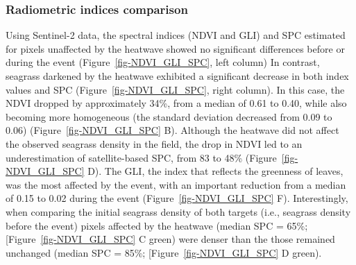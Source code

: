 \documentclass[
  number]{elsarticle}
\begin{document}
\subsubsection{Radiometric indices
comparison}\label{radiometric-indices-comparison}

Using Sentinel-2 data, the spectral indices (NDVI and GLI) and SPC
estimated for pixels unaffected by the heatwave showed no significant
differences before or during the event (Figure~\ref{fig-NDVI_GLI_SPC},
left column) In contrast, seagrass darkened by the heatwave exhibited a
significant decrease in both index values and SPC
(Figure~\ref{fig-NDVI_GLI_SPC}, right column). In this case, the NDVI
dropped by approximately 34\%, from a median of 0.61 to 0.40, while also
becoming more homogeneous (the standard deviation decreased from 0.09 to
0.06) (Figure~\ref{fig-NDVI_GLI_SPC} B). Although the heatwave did not
affect the observed seagrass density in the field, the drop in NDVI led
to an underestimation of satellite-based SPC, from 83 to 48\%
(Figure~\ref{fig-NDVI_GLI_SPC} D). The GLI, the index that reflects the
greenness of leaves, was the most affected by the event, with an
important reduction from a median of 0.15 to 0.02 during the event
(Figure~\ref{fig-NDVI_GLI_SPC} F). Interestingly, when comparing the
initial seagrass density of both targets (i.e., seagrass density before
the event) pixels affected by the heatwave (median SPC = 65\%;
{[}Figure~\ref{fig-NDVI_GLI_SPC} C green) were denser than the those
remained unchanged (median SPC = 85\%; {[}Figure~\ref{fig-NDVI_GLI_SPC}
D green).
\end{document}
